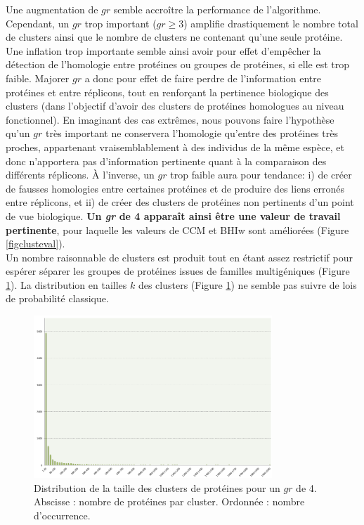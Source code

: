 Une augmentation de $gr$ semble accroître la performance de l'algorithme. Cependant, un $gr$ trop important ($gr\geq 3$) amplifie drastiquement le nombre total de clusters ainsi que le nombre de clusters ne contenant qu'une seule protéine. Une inflation trop importante semble ainsi avoir pour effet d'empêcher la détection de l'homologie entre protéines ou groupes de protéines, si elle est trop faible. Majorer $gr$ a donc pour effet de faire perdre de l'information entre protéines et entre réplicons, tout en renforçant la pertinence biologique des clusters (dans l'objectif d'avoir des clusters de protéines homologues au niveau fonctionnel). En imaginant des cas extrêmes, nous pouvons faire l'hypothèse qu'un $gr$ très important ne conservera l'homologie qu'entre des protéines très proches, appartenant vraisemblablement à des individus de la même espèce, et donc n'apportera pas d'information pertinente quant à la comparaison des différents réplicons. À l'inverse, un $gr$ trop faible aura pour tendance: i) de créer de fausses homologies entre certaines protéines et de produire des liens erronés entre réplicons, et ii) de créer des clusters de protéines non pertinents d'un point de vue biologique. \textbf{Un \textit{gr} de 4 apparaît ainsi être une valeur de travail pertinente}, pour laquelle les valeurs de CCM et BHIw sont améliorées (Figure \ref{figclusteval}).
\\
Un nombre raisonnable de clusters est produit tout en étant assez restrictif pour espérer séparer les groupes de protéines issues de familles multigéniques (Figure \ref{figclustersize}). La distribution en tailles $k$ des clusters (Figure \ref{figclustersize}) ne semble pas suivre de lois de probabilité classique.

\begin{figure}[H]
	\begin{center}
     \includegraphics[width=0.8\textwidth]{./img/cluster_size.png}
    	\caption[Distribution de la taille des clusters de protéines pour $gr$ = 4]{Distribution de la taille des clusters de protéines pour un $gr$ de 4. \\ Abscisse : nombre de protéines par cluster. Ordonnée : nombre d'occurrence.}\label{figclustersize}
	\end{center}
\end{figure}
 
